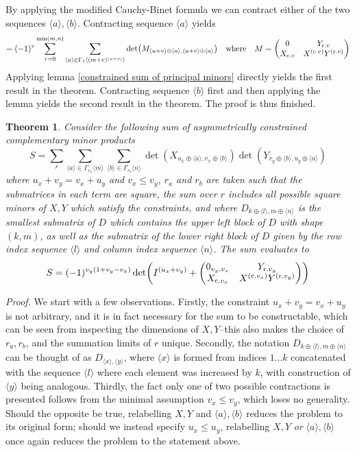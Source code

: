 \documentclass[12pt]{article}
\newcommand{\seq}[1]{\langle #1\rangle}
\newtheorem{theorem}{Theorem}[section]
\begin{document}
	By applying the modified Cauchy-Binet formula \cite[App. C]{modified_cauchy_binet} we can contract either of the two sequences $\seq{a},\seq{b}$. Contracting sequence $\seq{a}$ yields
	\begin{equation}
	=(-1)^v\sum_{r=0}^{\min(m,n)}\sum_{\seq{a}\in\Gamma_r\seq{(m+v)^{(u+v)}}}\det(M_{\seq{u+v}\oplus\seq{a},\seq{u+v}\oplus\seq{a}})\qq{where}M=\mqty(0 & Y_{\text{r.} v} \\ X_{\text{c.} v} & X^{(\text{c.} v)}Y^{(\text{r.} v)})
	\end{equation}
	Applying lemma \ref{constrained sum of principal minors} directly yields the first result in the theorem. Contracting sequence $\seq{b}$ first and then applying the lemma yields the second result in the theorem. The proof is thus finished.
	
	\begin{theorem}\label{theorem: asymmetrically constrained sum of complementary minor products}
	Consider the following sum of asymmetrically constrained complementary minor products
	\begin{equation}
	S=\sum_{r}\sum_{\seq{a}\in\Gamma_{r_a}\seq{m}}\sum_{\seq{b}\in\Gamma_{r_b}\seq{n}}\det(X_{u_x\oplus\seq{a},v_x\oplus\seq{b}})\det(Y_{v_y\oplus\seq{b},u_y\oplus\seq{a}})
	\end{equation}
	where $u_x+v_y=v_x+u_y$ and $v_x\leq v_y$, $r_a$ and $r_b$ are taken such that the submatrices in each term are square, the sum over $r$ includes all possible square minors of $X,Y$ which satisfy the constraints, and where $D_{k\oplus\seq{l},m\oplus\seq{n}}$ is the smallest submatrix of $D$ which contains the upper left block of $D$ with shape $(k,m)$, as well as the submatrix of the lower right block of $D$ given by the row index sequence $\seq{l}$ and column index sequence $\seq{n}$. The sum evaluates to
	\begin{equation}
	S=(-1)^{v_y(1+v_y-v_x)}\det(I^{(u_x+v_y)}+\mqty(
		0_{v_y,v_x} & Y_{\text{r.} v_y}\\
		X_{\text{c.} v_x} & X^{(\text{c.} v_x)} Y^{(\text{r.} v_y)}
	))
	\end{equation}
	\end{theorem}
	\textit{Proof.} We start with a few observations. Firstly, the constraint $u_x+v_y=v_x+u_y$ is not arbitrary, and it is in fact necessary for the sum to be constructable, which can be seen from inspecting the dimensions of $X,Y$--this also makes the choice of $r_a,r_b$, and the summation limits of $r$ unique. Secondly, the notation $D_{k\oplus\seq{l},m\oplus\seq{n}}$ can be thought of as $D_{\seq{x},\seq{y}}$, where $\seq{x}$ is formed from indices $1\dots k$ concatenated with the sequence $\seq{l}$ where each element was increased by $k$, with construction of $\seq{y}$ being analogous. Thirdly, the fact only one of two possible contractions is presented follows from the minimal assumption $v_x\leq v_y$, which loses no generality. Should the opposite be true, relabelling $X,Y$ and $\seq{a},\seq{b}$ reduces the problem to its original form; should we instead specify $u_x\leq u_y$, relabelling $X,Y$ \textit{or} $\seq{a},\seq{b}$ once again reduces the problem to the statement above.
	
\end{document}
